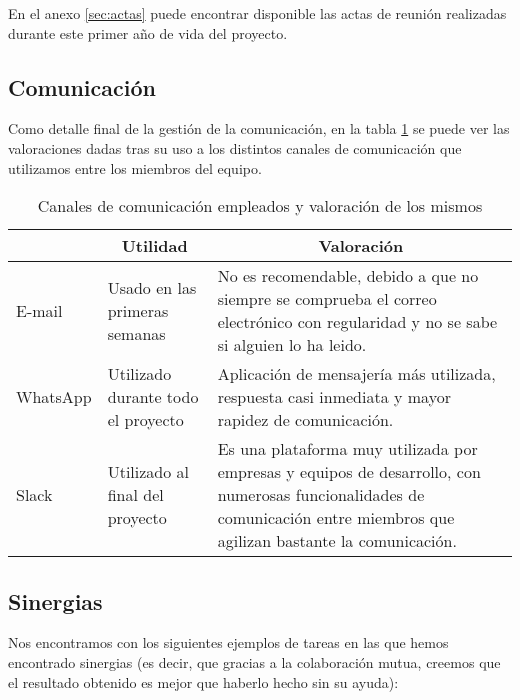 En el anexo \ref{sec:actas} puede encontrar disponible las actas de reunión realizadas durante este primer año de vida del proyecto.

\subsection{Comunicación}
Como detalle final de la gestión de la comunicación, en la tabla \ref{canalescomunicacion} se puede ver las valoraciones dadas tras su uso a los distintos canales de comunicación que utilizamos entre los miembros del equipo.

\begin{table}
    \begin{center}
        \begin{tabular}{|l|p{3cm}|p{5cm}|}
            \hline
                \rowcolor{Gray}\multicolumn{1}{|c|}{\textbf{Canal}}
                & \multicolumn{1}{|c|}{\textbf{Utilidad}} & \multicolumn{1}{|c|}{\textbf{Valoración}} \\
            \hline
                E-mail & Usado en las primeras semanas & No es recomendable, debido a que no siempre se comprueba el correo electrónico con regularidad y no se sabe si alguien lo ha leido. \\
            \hline
                WhatsApp \cite{whatsapp} & Utilizado durante todo el proyecto & Aplicación de mensajería más utilizada, respuesta casi inmediata y mayor rapidez de comunicación. \\
            \hline
                Slack \cite{slack} & Utilizado al final del proyecto & Es una plataforma muy utilizada por empresas y equipos de desarrollo, con numerosas funcionalidades de comunicación entre miembros que agilizan bastante la comunicación. \\
            \hline
        \end{tabular}

        \caption{Canales de comunicación empleados y valoración de los mismos}
        \label{canalescomunicacion}
    \end{center}
\end{table}

\subsection{Sinergias}
Nos encontramos con los siguientes ejemplos de tareas en las que hemos encontrado sinergias (es decir, que gracias a la colaboración mutua, creemos que el resultado obtenido es mejor que haberlo hecho sin su ayuda):


